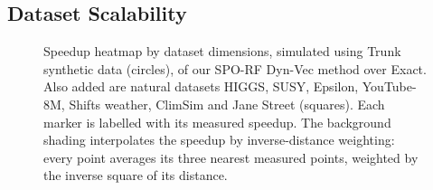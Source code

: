 \documentclass[sigconf]{acmart}%
\begin{document}



\subsection{Dataset Scalability}
\label{sec:res-scalability}

\begin{figure}[t]
    \centering
    
    \caption{Speedup heatmap by dataset dimensions, simulated using Trunk synthetic data (circles), of our SPO-RF Dyn-Vec method over Exact. Also added are natural datasets HIGGS, SUSY, Epsilon, YouTube-8M, Shifts weather, ClimSim and Jane Street (squares). Each marker is labelled
    with its measured speedup. The background shading interpolates the speedup by
    inverse-distance weighting: every point averages its three nearest measured points, weighted by the inverse square
    of its distance.}
    \label{fig:speedup-heatmap}
\end{figure}
\end{document}
